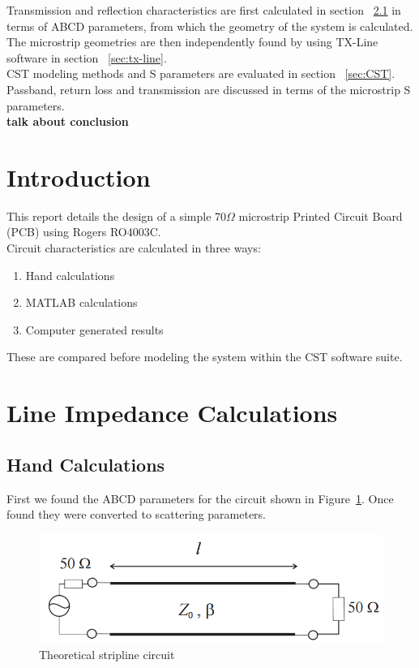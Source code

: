 \documentclass{paper}
\begin{document}
Transmission and reflection characteristics are first calculated in section ~\ref{sec:handcalcs} in terms of ABCD parameters, from which the geometry of the system is calculated. The microstrip geometries are then independently found by using TX-Line software in section ~\ref{sec:tx-line}.\\

CST modeling methods and S parameters are evaluated in section ~\ref{sec:CST}. Passband, return loss and transmission are discussed in terms of the microstrip S parameters.\\

\textbf{talk about conclusion}

\newpage
\tableofcontents

\newpage
\section{Introduction}
This report details the design of a simple 70$\Omega$ microstrip Printed Circuit Board (PCB) using Rogers RO4003C. \\

Circuit characteristics are calculated in three ways:

\begin{enumerate}
	\item Hand calculations
	\item MATLAB calculations
	\item Computer generated results\\
\end{enumerate}

These are compared before modeling the system within the CST software suite.\\
\newpage
\section{Line Impedance Calculations}
\subsection{Hand Calculations}
\label{sec:handcalcs}
First we found the ABCD parameters for the circuit shown in Figure~\ref{fig:theoretical_circuit}. Once found they were converted to scattering parameters.

\begin{figure}[H]
	\centering
	\includegraphics[scale=0.5]{IMG/theoretical_circuit}
	\caption{Theoretical stripline circuit}
	\label{fig:theoretical_circuit}
\end{figure}
\end{document}
